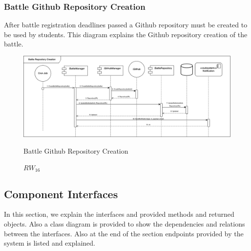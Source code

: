\subsubsection{Battle Github Repository Creation}
After battle registration deadlines passed a Github repository must be created to be used by students. This diagram explains the Github repository creation of the battle.
\begin{figure}[H]
    \centering
    \includegraphics[width=\linewidth]{Images/runtime/battle_repository_runtime.drawio.png}
    \caption{$RW_{16}$} Battle Github Repository Creation
\end{figure}

\subsection{Component Interfaces}
In this section, we explain the interfaces and provided methods and returned objects. Also a class diagram is provided to show the dependencies and relations between the interfaces. Also at the end of the section endpoints provided by the system is listed and explained.

